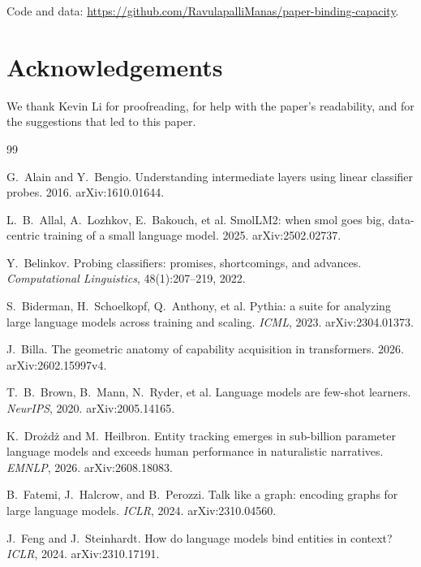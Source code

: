 \documentclass{article}
\begin{document}
{\raggedright
Code and data: \url{https://github.com/RavulapalliManas/paper-binding-capacity}.\par}

\section*{Acknowledgements}
We thank Kevin Li for proofreading, for help with the paper's readability, and for the suggestions that led to this paper.


\begin{thebibliography}{99}

G.~Alain and Y.~Bengio. Understanding intermediate layers using linear classifier probes. 2016.
arXiv:1610.01644.

L.~B.~Allal, A.~Lozhkov, E.~Bakouch, et al. SmolLM2: when smol goes big, data-centric training of a
small language model. 2025. arXiv:2502.02737.

Y.~Belinkov. Probing classifiers: promises, shortcomings, and advances. \emph{Computational
Linguistics}, 48(1):207--219, 2022.

S.~Biderman, H.~Schoelkopf, Q.~Anthony, et al. Pythia: a suite for analyzing large language
models across training and scaling. \emph{ICML}, 2023. arXiv:2304.01373.

J.~Billa. The geometric anatomy of capability acquisition in transformers. 2026.
arXiv:2602.15997v4.

T.~B.~Brown, B.~Mann, N.~Ryder, et al. Language models are few-shot learners.
\emph{NeurIPS}, 2020. arXiv:2005.14165.

K.~Dro\.{z}d\.{z} and M.~Heilbron. Entity tracking emerges in sub-billion parameter language
models and exceeds human performance in naturalistic narratives. \emph{EMNLP}, 2026.
arXiv:2608.18083.

B.~Fatemi, J.~Halcrow, and B.~Perozzi. Talk like a graph: encoding graphs for large language models.
\emph{ICLR}, 2024. arXiv:2310.04560.

J.~Feng and J.~Steinhardt. How do language models bind entities in context? \emph{ICLR}, 2024.
arXiv:2310.17191.


\end{thebibliography}
\end{document}
